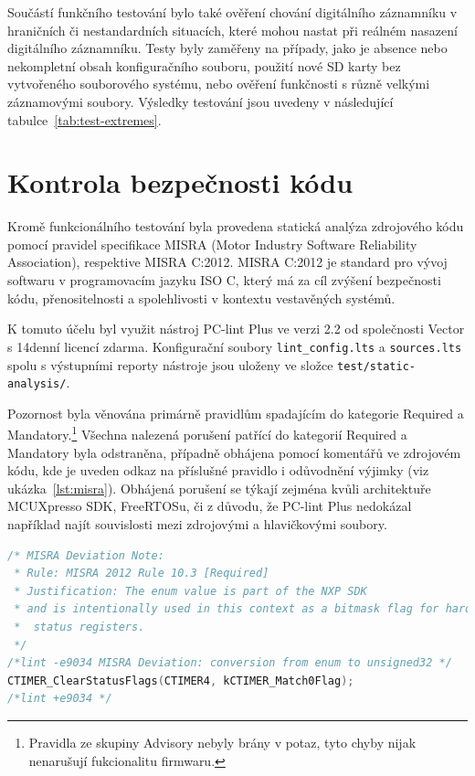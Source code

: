 Součástí funkčního testování bylo také ověření chování digitálního záznamníku v hraničních či nestandardních situacích, které mohou nastat při reálném nasazení digitálního záznamníku. Testy byly zaměřeny na případy, jako je absence nebo nekompletní obsah konfiguračního souboru, použití nové SD karty bez vytvořeného souborového systému, nebo ověření funkčnosti s různě velkými záznamovými soubory. Výsledky testování jsou uvedeny v následující tabulce~\ref{tab:test-extremes}.

\section{Kontrola bezpečnosti kódu}
Kromě funkcionálního testování byla provedena statická analýza zdrojového kódu pomocí pravidel specifikace MISRA (Motor Industry Software Reliability Association), respektive MISRA C:2012. MISRA C:2012 je standard pro vývoj softwaru v programovacím jazyku ISO C, který má za cíl zvýšení bezpečnosti kódu, přenositelnosti a spolehlivosti v kontextu vestavěných systémů.

K tomuto účelu byl využit nástroj PC-lint Plus ve verzi 2.2 od společnosti Vector s 14denní licencí zdarma. Konfigurační soubory \texttt{lint\_config.lts} a \texttt{sources.lts} spolu s výstupními reporty nástroje jsou uloženy ve složce \texttt{test/static-analysis/}.

Pozornost byla věnována primárně pravidlům spadajícím do kategorie Required a Mandatory.\footnote{Pravidla ze skupiny Advisory nebyly brány v potaz, tyto chyby nijak nenarušují fukcionalitu firmwaru.} Všechna nalezená porušení patřící do kategorií Required a Mandatory byla odstraněna, případně obhájena pomocí komentářů ve zdrojovém kódu, kde je uveden odkaz na příslušné pravidlo i odůvodnění výjimky (viz ukázka~\ref{lst:misra}). Obhájená porušení se týkají zejména kvůli architektuře MCUXpresso SDK, FreeRTOSu, či z důvodu, že PC-lint Plus nedokázal například najít souvislosti mezi zdrojovými a hlavičkovými soubory.

\begin{lstlisting}[language=C, caption={Ukázka odůvodněného porušení pravidla MISRA}, label={lst:misra}]
/* MISRA Deviation Note:
 * Rule: MISRA 2012 Rule 10.3 [Required]
 * Justification: The enum value is part of the NXP SDK
 * and is intentionally used in this context as a bitmask flag for hardware 
 *  status registers.
 */
/*lint -e9034 MISRA Deviation: conversion from enum to unsigned32 */
CTIMER_ClearStatusFlags(CTIMER4, kCTIMER_Match0Flag);
/*lint +e9034 */
\end{lstlisting}

